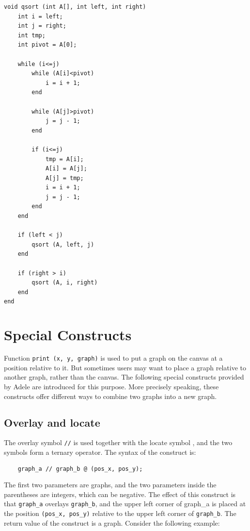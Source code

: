 \documentclass[11pt,letterpaper]{article}
\begin{document}
\begin{lstlisting}[caption=qsort.adl, label=qsort, captionpos=b, frame=single, tabsize=4]
void qsort (int A[], int left, int right)
	int i = left;
	int j = right;
	int tmp;
	int pivot = A[0];

	while (i<=j)
		while (A[i]<pivot)
			i = i + 1;
		end
  		
		while (A[j]>pivot)
			j = j - 1;
		end
  		
  		if (i<=j)
			tmp = A[i];
			A[i] = A[j];
			A[j] = tmp;
			i = i + 1;
			j = j - 1;
		end
	end

	if (left < j)
  		qsort (A, left, j)
	end

	if (right > i)
  		qsort (A, i, right)
	end
end
\end{lstlisting}


\section {Special Constructs}

Function \texttt{print (x, y, graph)} is used to put a graph on the canvas at a position relative to it. But sometimes users may want to place a graph relative to another graph, rather than the canvas. The following special constructs provided by Adele are introduced for this purpose. More precisely speaking, these constructs offer different ways to combine two graphs into a new graph.

\subsection {Overlay and locate}

The overlay symbol \texttt{//} is used together with the locate symbol \texttt{\@}, and the two symbols form a ternary operator. The syntax of the construct is:

\begin{lstlisting}
    graph_a // graph_b @ (pos_x, pos_y);
\end{lstlisting}

The first two parameters are graphs, and the two parameters inside the parentheses are integers, which can be negative. The effect of this construct is that \texttt{graph\_a} overlays \texttt{graph\_b}, and the upper left corner of graph\_a is placed at the position \texttt{(pos\_x, pos\_y)} relative to the upper left corner of \texttt{graph\_b}. The return value of the construct is a graph. Consider the following example:
\end{document}
